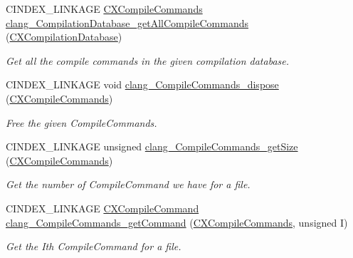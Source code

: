 \begin{DoxyCompactItemize}
\mbox{\label{group__COMPILATIONDB_ga65f9d58b6164f2637a2620cfbfe0fd84}} 
C\+I\+N\+D\+E\+X\+\_\+\+L\+I\+N\+K\+A\+GE \mbox{\hyperlink{group__COMPILATIONDB_gab8bb09eb53b86dbd645dc3ed2b6b7248}{C\+X\+Compile\+Commands}} \mbox{\hyperlink{group__COMPILATIONDB_ga65f9d58b6164f2637a2620cfbfe0fd84}{clang\+\_\+\+Compilation\+Database\+\_\+get\+All\+Compile\+Commands}} (\mbox{\hyperlink{group__COMPILATIONDB_gaecfc6e98d321bc436061472f4e4f84b2}{C\+X\+Compilation\+Database}})
\begin{DoxyCompactList}\small\item\em Get all the compile commands in the given compilation database. \end{DoxyCompactList}\item 
\mbox{\label{group__COMPILATIONDB_ga8955617a7123eae258acacf11b930505}} 
C\+I\+N\+D\+E\+X\+\_\+\+L\+I\+N\+K\+A\+GE void \mbox{\hyperlink{group__COMPILATIONDB_ga8955617a7123eae258acacf11b930505}{clang\+\_\+\+Compile\+Commands\+\_\+dispose}} (\mbox{\hyperlink{group__COMPILATIONDB_gab8bb09eb53b86dbd645dc3ed2b6b7248}{C\+X\+Compile\+Commands}})
\begin{DoxyCompactList}\small\item\em Free the given Compile\+Commands. \end{DoxyCompactList}\item 
\mbox{\label{group__COMPILATIONDB_ga276329b9260a0b7d2ed25ccb8da88066}} 
C\+I\+N\+D\+E\+X\+\_\+\+L\+I\+N\+K\+A\+GE unsigned \mbox{\hyperlink{group__COMPILATIONDB_ga276329b9260a0b7d2ed25ccb8da88066}{clang\+\_\+\+Compile\+Commands\+\_\+get\+Size}} (\mbox{\hyperlink{group__COMPILATIONDB_gab8bb09eb53b86dbd645dc3ed2b6b7248}{C\+X\+Compile\+Commands}})
\begin{DoxyCompactList}\small\item\em Get the number of Compile\+Command we have for a file. \end{DoxyCompactList}\item 
C\+I\+N\+D\+E\+X\+\_\+\+L\+I\+N\+K\+A\+GE \mbox{\hyperlink{group__COMPILATIONDB_gae59272595ab7fa4c1ed03348c56264bf}{C\+X\+Compile\+Command}} \mbox{\hyperlink{group__COMPILATIONDB_gae623cfcbfc272851154922ede0ed2b8f}{clang\+\_\+\+Compile\+Commands\+\_\+get\+Command}} (\mbox{\hyperlink{group__COMPILATIONDB_gab8bb09eb53b86dbd645dc3ed2b6b7248}{C\+X\+Compile\+Commands}}, unsigned I)
\begin{DoxyCompactList}\small\item\em Get the I\textquotesingle{}th Compile\+Command for a file. \end{DoxyCompactList}\item 

\end{DoxyCompactItemize}
